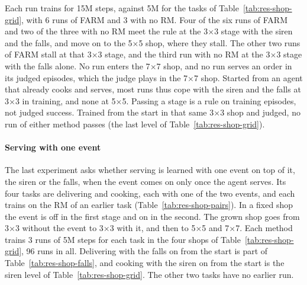 \documentclass[11pt,english,listoffigures,listoftables]{tfgetsinf}
\begin{document}
Each run trains for 15M steps, against 5M for the tasks of Table~\ref{tab:res-shop-grid}, with 6 runs of FARM and 3 with no RM. Four of the six runs of FARM and two of the three with no RM meet the rule at the 3$\times$3 stage with the siren and the falls, and move on to the 5$\times$5 shop, where they stall. The other two runs of FARM stall at that 3$\times$3 stage, and the third run with no RM at the 3$\times$3 stage with the falls alone. No run enters the 7$\times$7 shop, and no run serves an order in its judged episodes, which the judge plays in the 7$\times$7 shop. Started from an agent that already cooks and serves, most runs thus cope with the siren and the falls at 3$\times$3 in training, and none at 5$\times$5. Passing a stage is a rule on training episodes, not judged success. Trained from the start in that same 3$\times$3 shop and judged, no run of either method passes (the last level of Table~\ref{tab:res-shop-grid}).

\paragraph{Serving with one event} The last experiment asks whether serving is learned with one event on top of it, the siren or the falls, when the event comes on only once the agent serves. Its four tasks are delivering and cooking, each with one of the two events, and each trains on the RM of an earlier task (Table~\ref{tab:res-shop-pairs}). In a fixed shop the event is off in the first stage and on in the second. The grown shop goes from 3$\times$3 without the event to 3$\times$3 with it, and then to 5$\times$5 and 7$\times$7. Each method trains 3 runs of 5M steps for each task in the four shops of Table~\ref{tab:res-shop-grid}, 96 runs in all. Delivering with the falls on from the start is part of Table~\ref{tab:res-shop-falls}, and cooking with the siren on from the start is the siren level of Table~\ref{tab:res-shop-grid}. The other two tasks have no earlier run.
\end{document}
